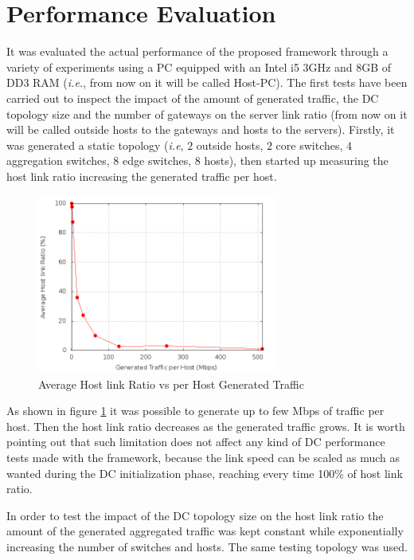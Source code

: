 \documentclass[12pt,english,oneside]{book}
\begin{document}
\section{Performance Evaluation}
\label{sec:perf}
\hspace{0.6cm}

It was evaluated the actual performance of the proposed framework through a variety of experiments using a PC equipped with an Intel i5 3GHz and 8GB of DD3 RAM (\textit{i.e.}, from now on it will be called Host-PC).
The first tests have been carried out to inspect the impact of the amount of generated traffic, the DC topology size and the number of gateways on the server link ratio (from now on it will be called outside hosts to the gateways and hosts to the servers).
Firstly, it was generated a static topology (\textit{i.e}, $2$ outside hosts, $2$ core switches, $4$ aggregation switches, $8$ edge switches, $8$ hosts), then started up measuring the host link ratio increasing the generated traffic per host.

\begin{figure}[h!tbp]
        \centering
        \includegraphics[width=0.7\textwidth]{figures/bw_utilization.png}
        \caption{Average Host link Ratio vs per Host Generated Traffic}
        \label{fig:bw}
\end{figure}

As shown in figure \ref{fig:bw} it was possible to generate up to few Mbps of traffic per host.
Then the host link ratio decreases as the generated traffic grows.
It is worth pointing out that such limitation does not affect any kind of DC performance tests made with the framework,
because the link speed can be scaled as much as wanted during the DC initialization phase, reaching every time 100\% of host link ratio.

In order to test the impact of the DC topology size on the
host link ratio the amount of the generated aggregated traffic was kept 
constant while exponentially increasing the number of switches and hosts.
The same testing topology was used.
\end{document}
